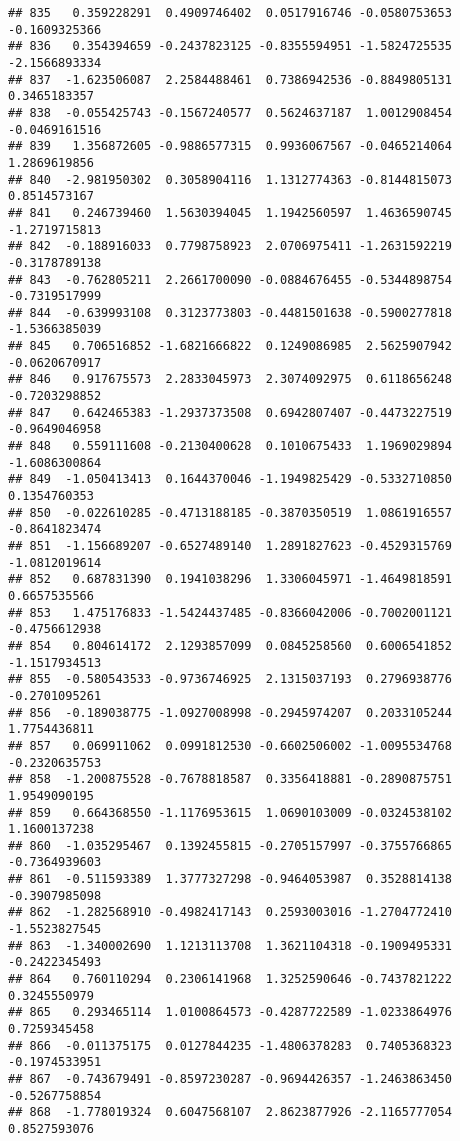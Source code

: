 \documentclass[
]{article}
\begin{document}
\begin{verbatim}
## 835   0.359228291  0.4909746402  0.0517916746 -0.0580753653 -0.1609325366
## 836   0.354394659 -0.2437823125 -0.8355594951 -1.5824725535 -2.1566893334
## 837  -1.623506087  2.2584488461  0.7386942536 -0.8849805131  0.3465183357
## 838  -0.055425743 -0.1567240577  0.5624637187  1.0012908454 -0.0469161516
## 839   1.356872605 -0.9886577315  0.9936067567 -0.0465214064  1.2869619856
## 840  -2.981950302  0.3058904116  1.1312774363 -0.8144815073  0.8514573167
## 841   0.246739460  1.5630394045  1.1942560597  1.4636590745 -1.2719715813
## 842  -0.188916033  0.7798758923  2.0706975411 -1.2631592219 -0.3178789138
## 843  -0.762805211  2.2661700090 -0.0884676455 -0.5344898754 -0.7319517999
## 844  -0.639993108  0.3123773803 -0.4481501638 -0.5900277818 -1.5366385039
## 845   0.706516852 -1.6821666822  0.1249086985  2.5625907942 -0.0620670917
## 846   0.917675573  2.2833045973  2.3074092975  0.6118656248 -0.7203298852
## 847   0.642465383 -1.2937373508  0.6942807407 -0.4473227519 -0.9649046958
## 848   0.559111608 -0.2130400628  0.1010675433  1.1969029894 -1.6086300864
## 849  -1.050413413  0.1644370046 -1.1949825429 -0.5332710850  0.1354760353
## 850  -0.022610285 -0.4713188185 -0.3870350519  1.0861916557 -0.8641823474
## 851  -1.156689207 -0.6527489140  1.2891827623 -0.4529315769 -1.0812019614
## 852   0.687831390  0.1941038296  1.3306045971 -1.4649818591  0.6657535566
## 853   1.475176833 -1.5424437485 -0.8366042006 -0.7002001121 -0.4756612938
## 854   0.804614172  2.1293857099  0.0845258560  0.6006541852 -1.1517934513
## 855  -0.580543533 -0.9736746925  2.1315037193  0.2796938776 -0.2701095261
## 856  -0.189038775 -1.0927008998 -0.2945974207  0.2033105244  1.7754436811
## 857   0.069911062  0.0991812530 -0.6602506002 -1.0095534768 -0.2320635753
## 858  -1.200875528 -0.7678818587  0.3356418881 -0.2890875751  1.9549090195
## 859   0.664368550 -1.1176953615  1.0690103009 -0.0324538102  1.1600137238
## 860  -1.035295467  0.1392455815 -0.2705157997 -0.3755766865 -0.7364939603
## 861  -0.511593389  1.3777327298 -0.9464053987  0.3528814138 -0.3907985098
## 862  -1.282568910 -0.4982417143  0.2593003016 -1.2704772410 -1.5523827545
## 863  -1.340002690  1.1213113708  1.3621104318 -0.1909495331 -0.2422345493
## 864   0.760110294  0.2306141968  1.3252590646 -0.7437821222  0.3245550979
## 865   0.293465114  1.0100864573 -0.4287722589 -1.0233864976  0.7259345458
## 866  -0.011375175  0.0127844235 -1.4806378283  0.7405368323 -0.1974533951
## 867  -0.743679491 -0.8597230287 -0.9694426357 -1.2463863450 -0.5267758854
## 868  -1.778019324  0.6047568107  2.8623877926 -2.1165777054  0.8527593076

\end{verbatim}
\end{document}

